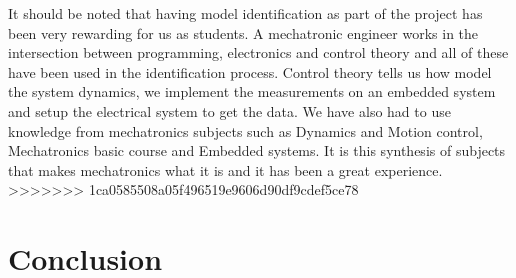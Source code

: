 It should be noted that having model identification as part of the project has
been very rewarding for us as students. A mechatronic engineer works in the
intersection between programming, electronics and control theory and all of
these have been used in the identification process. Control theory tells us how
model the system dynamics, we implement the measurements on an embedded system
and setup the electrical system to get the data. We have also had to use
knowledge from mechatronics subjects such as Dynamics and Motion control,
Mechatronics basic course and Embedded systems. It is this synthesis of subjects
that makes mechatronics what it is and it has been a great experience. 
>>>>>>> 1ca0585508a05f496519e9606d90df9cdef5ce78
\section{Conclusion}
